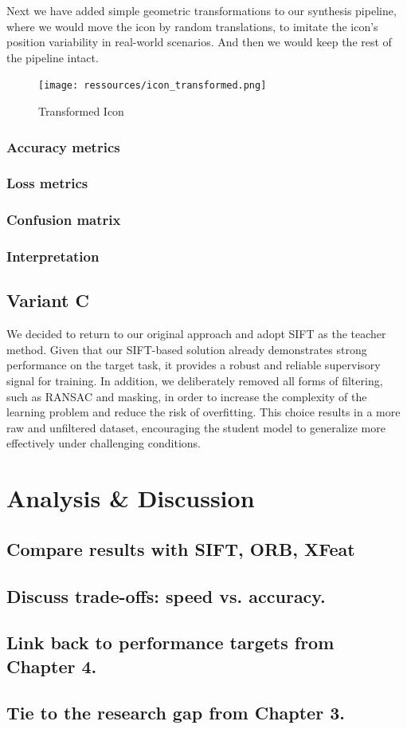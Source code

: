 Next we have added simple geometric transformations to our synthesis pipeline, where we would move the icon by random translations, to imitate the icon's position variability in real-world scenarios. And then we would keep the rest of the pipeline intact.
\begin{figure}[H]
    \centering
    \texttt{[image: ressources/icon\_transformed.png]}
    \caption{Transformed Icon}
    \label{fig:transformed_icon}
\end{figure}
\subsubsection{Accuracy metrics}
\subsubsection{Loss metrics}
\subsubsection{Confusion matrix}
\subsubsection{Interpretation}

\subsection{Variant C}
We decided to return to our original approach and adopt SIFT as the teacher method. Given that our SIFT-based solution already demonstrates strong performance on the target task, it provides a robust and reliable supervisory signal for training. In addition, we deliberately removed all forms of filtering, such as RANSAC and masking, in order to increase the complexity of the learning problem and reduce the risk of overfitting. This choice results in a more raw and unfiltered dataset, encouraging the student model to generalize more effectively under challenging conditions.
\section{Analysis \& Discussion}
\subsection{Compare results with SIFT, ORB, XFeat}
\subsection{Discuss trade-offs: speed vs. accuracy.}
\subsection{Link back to performance targets from Chapter 4.}
\subsection{Tie to the research gap from Chapter 3.}

